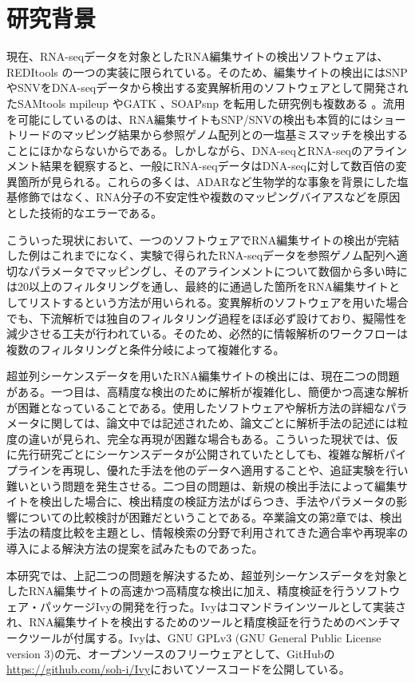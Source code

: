 \section{研究背景}
現在、RNA-seqデータを対象としたRNA編集サイトの検出ソフトウェアは、REDItools \citep{Picardi:2013aa}の一つの実装に限られている。そのため、編集サイトの検出にはSNPやSNVをDNA-seqデータから検出する変異解析用のソフトウェアとして開発されたSAMtools mpileup \citep{Li:2009aa}やGATK \citep{McKenna:2010aa}、SOAPsnp \citep{Yu:2013aa}を転用した研究例も複数ある \citep{Danecek:2012aa, Chen:2012aa, Sanjana:2012aa, Peng:2012aa}。流用を可能にしているのは、RNA編集サイトもSNP/SNVの検出も本質的にはショートリードのマッピング結果から参照ゲノム配列との一塩基ミスマッチを検出することにほかならないからである。しかしながら、DNA-seqとRNA-seqのアラインメント結果を観察すると、一般にRNA-seqデータはDNA-seqに対して数百倍の変異箇所が見られる。これらの多くは、ADARなど生物学的な事象を背景にした塩基修飾ではなく、RNA分子の不安定性や複数のマッピングバイアスなどを原因とした技術的なエラーである。
\par
こういった現状において、一つのソフトウェアでRNA編集サイトの検出が完結した例はこれまでになく、実験で得られたRNA-seqデータを参照ゲノム配列へ適切なパラメータでマッピングし、そのアラインメントについて数個から多い時には20以上のフィルタリングを通し、最終的に通過した箇所をRNA編集サイトとしてリストするという方法が用いられる。変異解析のソフトウェアを用いた場合でも、下流解析では独自のフィルタリング過程をほぼ必ず設けており、擬陽性を減少させる工夫が行われている。そのため、必然的に情報解析のワークフローは複数のフィルタリングと条件分岐によって複雑化する。
\par
超並列シーケンスデータを用いたRNA編集サイトの検出には、現在二つの問題がある。一つ目は、高精度な検出のために解析が複雑化し、簡便かつ高速な解析が困難となっていることである。使用したソフトウェアや解析方法の詳細なパラメータに関しては、論文中では記述されため、論文ごとに解析手法の記述には粒度の違いが見られ、完全な再現が困難な場合もある。こういった現状では、仮に先行研究ごとにシーケンスデータが公開されていたとしても、複雑な解析パイプラインを再現し、優れた手法を他のデータへ適用することや、追証実験を行い難いという問題を発生させる。二つ目の問題は、新規の検出手法によって編集サイトを検出した場合に、検出精度の検証方法がばらつき、手法やパラメータの影響についての比較検討が困難だということである。卒業論文の第2章では、検出手法の精度比較を主題とし、情報検索の分野で利用されてきた適合率や再現率の導入による解決方法の提案を試みたものであった。
\par
本研究では、上記二つの問題を解決するため、超並列シーケンスデータを対象としたRNA編集サイトの高速かつ高精度な検出に加え、精度検証を行うソフトウェア・パッケージIvyの開発を行った。Ivyはコマンドラインツールとして実装され、RNA編集サイトを検出するためのツールと精度検証を行うためのベンチマークツールが付属する。Ivyは、GNU GPLv3 (GNU General Public License version 3)の元、オープンソースのフリーウェアとして、GitHubの\url{https://github.com/soh-i/Ivy}においてソースコードを公開している。

